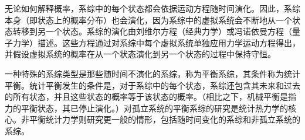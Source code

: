 无论如何解释概率，系综中的每个状态都会依据运动方程随时间演化。因此，系综本身（即状态上的概率分布）也会演化，因为系综中的虚拟系统会不断地从一个状态转移到另一个状态。系综的演化由刘维尔方程（经典力学）或冯诺依曼方程（量子力学）描述。这些方程通过对系综中每个虚拟系统单独应用力学运动方程得出，并假设虚拟系统的概率在从一个状态演化到另一个状态的过程中保持守恒。

一种特殊的系综类型是那些随时间不演化的系综，称为平衡系综，其条件称为统计平衡。统计平衡发生的条件是，对于系综中的每个状态，系综还包含其未来和过去的所有状态，并且这些状态的概率等于该状态的概率。（相比之下，机械平衡是指力的平衡状态，其已停止演化。）对孤立系统的平衡系综的研究是统计热力学的核心。非平衡统计力学则研究更一般的情形，包括随时间变化的系综和非孤立系统的系综。